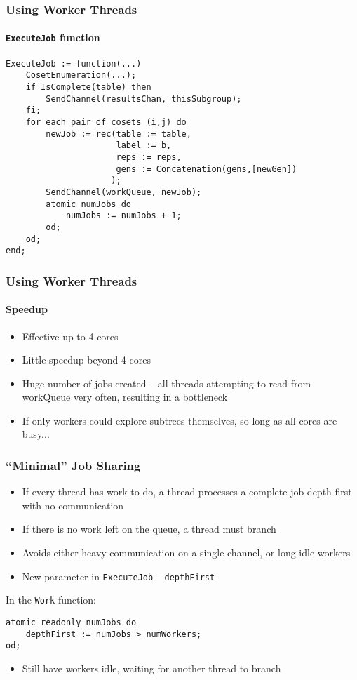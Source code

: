 \documentclass{beamer}
\begin{document}
\begin{frame}[fragile]
  \frametitle{Using Worker Threads}
  \framesubtitle{\texttt{ExecuteJob} function}
\begin{verbatim}
ExecuteJob := function(...)
    CosetEnumeration(...);
    if IsComplete(table) then
        SendChannel(resultsChan, thisSubgroup);
    fi;
    for each pair of cosets (i,j) do
        newJob := rec(table := table,
                      label := b,
                      reps := reps,
                      gens := Concatenation(gens,[newGen])
                     );
        SendChannel(workQueue, newJob);
        atomic numJobs do
            numJobs := numJobs + 1;
        od;
    od;
end;
\end{verbatim}
\end{frame}

\begin{frame}
  \frametitle{Using Worker Threads}
  \framesubtitle{Speedup} \pause
  \begin{itemize}
  \item Effective up to 4 cores
  \item Little speedup beyond 4 cores \pause
  \item Huge number of jobs created -- all threads attempting to read from workQueue very often, resulting in a bottleneck \pause
  \item If only workers could explore subtrees themselves, so long as all cores are busy...
  \end{itemize}
\end{frame}

\begin{frame}[fragile]
  \frametitle{``Minimal'' Job Sharing} \pause
  \begin{itemize}
  \item If every thread has work to do, a thread processes a complete job depth-first with no communication \pause
  \item If there is no work left on the queue, a thread must branch \pause
  \item Avoids either heavy communication on a single channel, or long-idle workers \pause
  \item New parameter in \texttt{ExecuteJob} -- \texttt{depthFirst} \pause
  \end{itemize}
In the \texttt{Work} function:
\begin{verbatim}
atomic readonly numJobs do
    depthFirst := numJobs > numWorkers;
od;
\end{verbatim} \pause
\begin{itemize}
\item Still have workers idle, waiting for another thread to branch
\end{itemize}

\end{frame}
\end{document}
